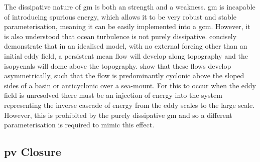 \documentclass[12pt,a4paper]{report}
\begin{document}
        The dissipative nature of \gls{gm} is both an strength and a
         weakness. \gls{gm} is incapable of introducing spurious energy,
         which allows it to be very robust and stable
         parameterisation, meaning it can be easily implemented 
         into a \gls{gcm}. However, it is also understood that
         ocean turbulence is not purely dissipative.
          \cite{adcock2000interactions} concisely demonstrate that
         in an idealised model, with no external forcing other
         than an initial eddy field, a persistent mean flow will develop along
         topography and the isopycnals will dome above the topography.
          \cite{nost2008asymmetry} show that these
         flows develop asymmetrically, such that the flow is 
         predominantly cyclonic above the sloped sides of
         a basin or anticyclonic over a sea-mount. For this to occur 
         when the eddy field is unresolved there must be an 
         injection of energy into the system representing the 
         inverse cascade of energy from the eddy scales to the large scale.
         However, this is prohibited by the purely dissipative \gls{gm}
         and so a different parameterisation is required to mimic this
         effect.
         
         
         
         \subsection{\gls{pv} Closure}
         
\end{document}
